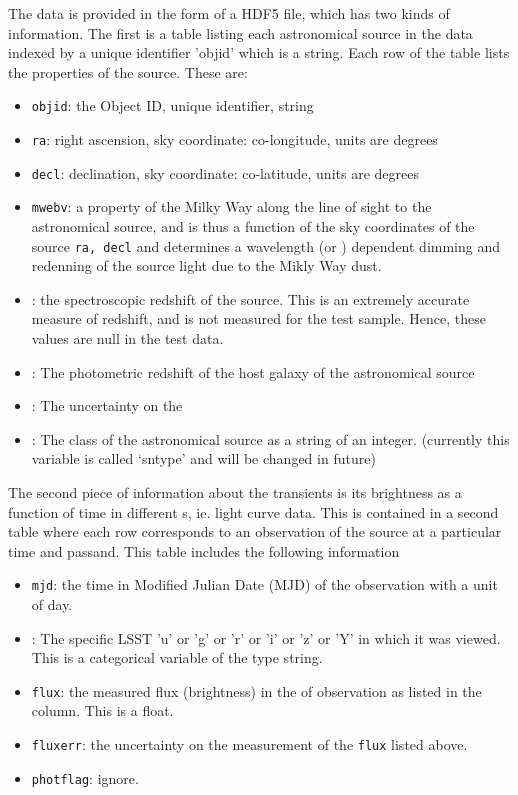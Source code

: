 \documentclass[\docopts]{\docclass}
\begin{document}
The {\plasticc} data is provided in the form of a HDF5 file, which has two kinds of information. The first
is a table listing each astronomical source in the data indexed by a unique identifier 'objid' which is a string. Each row of the table lists the properties of the source. These are: 
\begin{itemize}
\item {\tt objid}: the Object ID, unique identifier, string
\item {\tt ra}: right ascension, sky coordinate: co-longitude, units are degrees
\item {\tt decl}: declination, sky coordinate: co-latitude, units are degrees
\item {\tt mwebv}: a property of the Milky Way along the line of sight to the astronomical source, and is thus a function of the sky coordinates of the source {\tt ra, decl} and determines a wavelength (or {\passband}) dependent dimming and redenning of the source light due to the Mikly Way dust.  
\item {\specz}: the spectroscopic redshift of the source. This is an extremely accurate measure of redshift, 
    and is not measured for the test sample. Hence, these values are null in the test data.
\item {\hostphotoz} : The photometric redshift of the host galaxy of the astronomical source
\item {\hostphotozerr} : The uncertainty on the {\hostphotoz}
\item {\class} : The class of the astronomical source as a string of an integer. (currently this variable is called `sntype' and will be changed in future)
\end{itemize}

The second piece of information about the transients is its brightness as a function of time in different {\passband}s, ie. light curve data. This is contained in a second table where each row corresponds to an observation of the source at a particular time and passand.  This table includes the following information
\begin{itemize}
\item {\tt mjd}: the time in Modified Julian Date (MJD) of the observation with a unit of day.
\item {\passband} : The specific LSST {\passband} 'u' or 'g' or 'r' or 'i' or 'z' or 'Y' in which it was viewed. This is a categorical variable of the type string. 
\item {\tt flux}: the measured flux (brightness) in the {\passband} of observation as listed in the {\passband} column. This is a float.
\item {\tt fluxerr}: the uncertainty on the measurement of the {\tt flux}  listed above.
\item {\tt photflag}: ignore.
\end{itemize}
\end{document}
